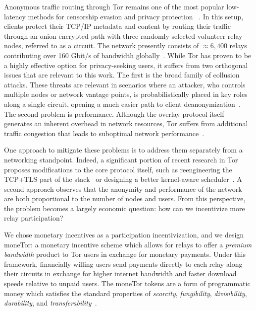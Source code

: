 Anonymous traffic routing through Tor remains one of the most popular
low-latency methods for censorship evasion and privacy protection
~\cite{dingledine2004tor}. In this setup, clients protect their TCP/IP metadata
and content by routing their traffic through an onion encrypted path with three
randomly selected volunteer relay nodes, referred to as a circuit. The network
presently consists of $\approx 6,400$ relays contributing over 160 Gbit/s of
bandwidth globally~\cite{portal2018tormetrics}. While Tor has proven to be a
highly effective option for privacy-seeking users, it suffers from two
orthogonal issues that are relevant to this work. The first is the broad family
of collusion attacks. These threats are relevant in scenarios where an attacker,
who controls multiple nodes or network vantage points, is probabilistically
placed in key roles along a single circuit, opening a much easier path to client
deanonymization~\cite{wright2004predecessor,murdoch2005low}. The second problem
is performance. Although the overlay protocol itself generates an inherent
overhead in network resources, Tor suffers from additional traffic congestion
that leads to suboptimal network performance~\cite{portal2018tormetrics,
  alsabah2016performance}.

One approach to mitigate these problems is to address them separately from a
networking standpoint. Indeed, a significant portion of recent research in Tor
proposes modifications to the core protocol itself, such as reengineering the
TCP+TLS part of the stack~\cite{reardon2009improving} or designing a better
kernel-aware scheduler~\cite{jansen2014never}. A second approach observes that
the anonymity and performance of the network are both proportional to the number
of nodes and users. From this perspective, the problem becomes a largely
economic question: how can we incentivize more relay participation?

We chose monetary incentives as a participation incentivization, and we design moneTor: a monetary incentive scheme which allows for relays to offer a \emph{premium bandwidth} product
to Tor users in exchange for monetary payments. Under this framework,
financially willing users send payments directly to each relay along their circuits
in exchange for higher internet bandwidth and faster download speeds relative to
unpaid users. %
The moneTor tokens %
are a form of programmatic money which satisfies the standard properties of
\textit{scarcity}, \textit{fungibility}, \textit{divisibility},
\textit{durability}, and
\textit{transferability}~\cite[p.3]{crump2011phenomenon}.

